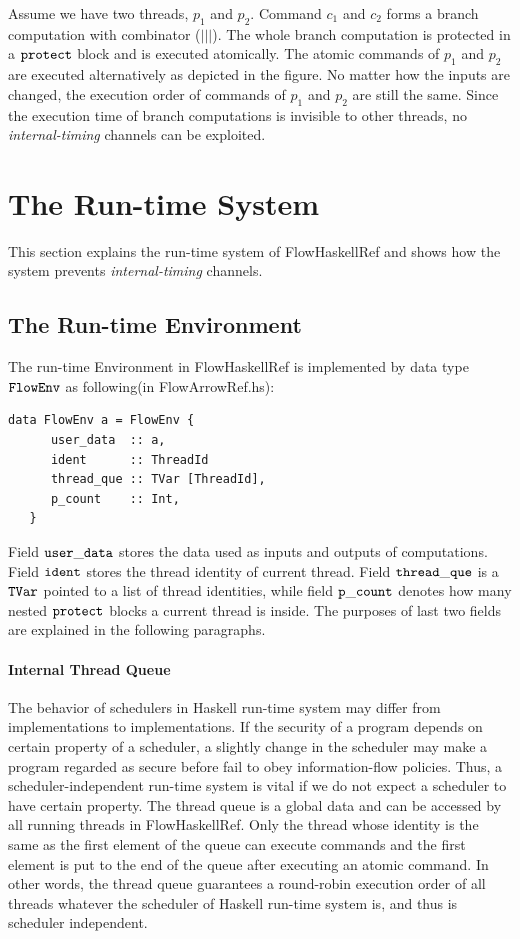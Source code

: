 \documentclass{report}
\newcommand{\co}[1]{$\cod{#1}$}
\begin{document}
Assume we have two threads, $p_1$ and $p_2$. Command $c_1$ and $c_2$ forms a branch computation with combinator
($|||$). The whole branch computation is protected in a \co{protect} block and is executed atomically.
The atomic commands of $p_1$ and $p_2$ are executed alternatively as depicted in the figure.
No matter how the inputs are changed, the execution order of commands of $p_1$ and $p_2$ are still the same.
Since the execution time of branch computations is invisible to other threads, no {\em internal-timing}
channels can be exploited.

\section{The Run-time System}
\label{chap7:runtime}

This section explains the run-time system of FlowHaskellRef
and shows how the system prevents {\em internal-timing} channels.

\subsection{The Run-time Environment}
The run-time Environment in FlowHaskellRef is implemented by data type \co{FlowEnv} 
as following(in FlowArrowRef.hs):
\begin{Verbatim}[fontsize=\small]
data FlowEnv a = FlowEnv {
      user_data  :: a,                    
      ident      :: ThreadId        
      thread_que :: TVar [ThreadId],      
      p_count    :: Int,                   
   }
\end{Verbatim}
Field \co{user\_data} stores the data used as inputs and outputs of computations. 
Field \co{ident} stores the thread identity of current thread. 
Field \co{thread\_que} is a \co{TVar} pointed to a list of thread identities, while
field \co{p\_count} denotes how many nested \co{protect} blocks a current thread is inside.
The purposes of last two fields are explained in the following paragraphs.

\paragraph{Internal Thread Queue}
The behavior of schedulers in Haskell run-time system may differ from implementations to implementations. 
If the security of a program depends on certain property of a scheduler, a slightly change in the
scheduler may make a program regarded as secure before fail to obey information-flow policies.
Thus, a scheduler-independent run-time system is vital if we do not expect a scheduler to have certain property.
The thread queue is a global data
and can be accessed by all running threads in FlowHaskellRef. 
Only the thread whose identity is the same as the first element of the queue
can execute commands and the first element is put to the end of the queue after executing an atomic command.
In other words, the thread queue guarantees a round-robin execution order of all threads whatever
the scheduler of Haskell run-time system is, and thus is scheduler independent.
\end{document}
